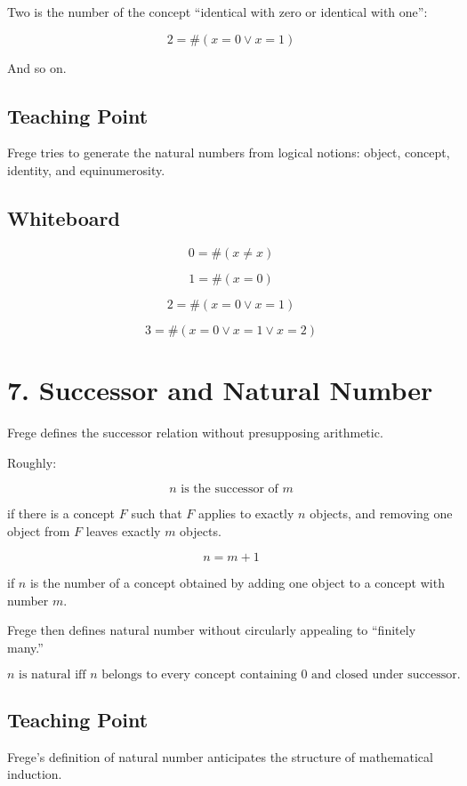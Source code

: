 \documentclass[11pt]{article}
\begin{document}
Two is the number of the concept ``identical with zero or identical with one'':

\[
2 = \#(x=0 \lor x=1)
\]

And so on.

\subsection*{Teaching Point}

Frege tries to generate the natural numbers from logical notions: object, concept, identity,
and equinumerosity.

\subsection*{Whiteboard}

\[
0 = \#(x \neq x)
\]

\[
1 = \#(x=0)
\]

\[
2 = \#(x=0 \lor x=1)
\]

\[
3 = \#(x=0 \lor x=1 \lor x=2)
\]

\section*{7. Successor and Natural Number}

Frege defines the successor relation without presupposing arithmetic.

Roughly:

\[
n \text{ is the successor of } m
\]

if there is a concept \(F\) such that \(F\) applies to exactly \(n\) objects, and removing one
object from \(F\) leaves exactly \(m\) objects.

\[
n = m+1
\]

if \(n\) is the number of a concept obtained by adding one object to a concept with number
\(m\).

Frege then defines natural number without circularly appealing to ``finitely many.''

\[
n \text{ is natural iff } n \text{ belongs to every concept containing }0
\text{ and closed under successor.}
\]

\subsection*{Teaching Point}

Frege's definition of natural number anticipates the structure of mathematical induction.
\end{document}
